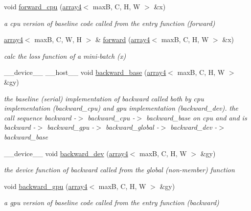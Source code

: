 \begin{DoxyCompactItemize}
void \hyperlink{structDropout_a2adc263cee9f2d84a8d0729ffaf924a6}{forward\+\_\+cpu} (\hyperlink{structarray4}{array4}$<$ maxB, C, H, W $>$ \&x)
\begin{DoxyCompactList}\small\item\em a cpu version of baseline code called from the entry function (forward) \end{DoxyCompactList}\item 
\hyperlink{structarray4}{array4}$<$ maxB, C, W, H $>$ \& \hyperlink{structDropout_a155eb3ad77df591bdd95645fec1f2089}{forward} (\hyperlink{structarray4}{array4}$<$ maxB, C, H, W $>$ \&x)
\begin{DoxyCompactList}\small\item\em calc the loss function of a mini-\/batch (x) \end{DoxyCompactList}\item 
\+\_\+\+\_\+device\+\_\+\+\_\+ \+\_\+\+\_\+host\+\_\+\+\_\+ void \hyperlink{structDropout_a8ea26e89ddc6b5e4546f5a6ed019ad9a}{backward\+\_\+base} (\hyperlink{structarray4}{array4}$<$ maxB, C, H, W $>$ \&gy)
\begin{DoxyCompactList}\small\item\em the baseline (serial) implementation of backward called both by cpu implementation (backward\+\_\+cpu) and gpu implementation (backward\+\_\+dev). the call sequence backward -\/$>$ backward\+\_\+cpu -\/$>$ backward\+\_\+base on cpu and and is backward -\/$>$ backward\+\_\+gpu -\/$>$ backward\+\_\+global -\/$>$ backward\+\_\+dev -\/$>$ backward\+\_\+base \end{DoxyCompactList}\item 
\+\_\+\+\_\+device\+\_\+\+\_\+ void \hyperlink{structDropout_a5bbc54ad4125bf6768b5eeb17802a468}{backward\+\_\+dev} (\hyperlink{structarray4}{array4}$<$ maxB, C, H, W $>$ \&gy)
\begin{DoxyCompactList}\small\item\em the device function of backward called from the global (non-\/member) function \end{DoxyCompactList}\item 
void \hyperlink{structDropout_a138fbe07114851e478ac794629b6f44a}{backward\+\_\+gpu} (\hyperlink{structarray4}{array4}$<$ maxB, C, H, W $>$ \&gy)
\begin{DoxyCompactList}\small\item\em a gpu version of baseline code called from the entry function (backward) \end{DoxyCompactList}\item 

\end{DoxyCompactItemize}

